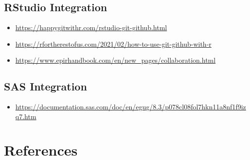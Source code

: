 \documentclass[
  letterpaper,
  DIV=11,
  numbers=noendperiod]{scrreprt}
\providecommand{\tightlist}{%
  \setlength{\itemsep}{0pt}\setlength{\parskip}{0pt}}\usepackage{longtable,booktabs,array}
\newlength{\cslhangindent}
\newlength{\cslentryspacingunit} %
\newenvironment{CSLReferences}[2] %
 {%
  \setlength{\parindent}{0pt}
  \ifodd #1
  \let\oldpar\par
  \def\par{\hangindent=\cslhangindent\oldpar}
  \fi
  \setlength{\parskip}{#2\cslentryspacingunit}
 }%
 {}
\begin{document}
\hypertarget{rstudio-integration}{%
\section{RStudio Integration}\label{rstudio-integration}}

\begin{itemize}
\item
  \url{https://happygitwithr.com/rstudio-git-github.html}
\item
  \url{https://rfortherestofus.com/2021/02/how-to-use-git-github-with-r}
\item
  \url{https://www.epirhandbook.com/en/new_pages/collaboration.html}
\end{itemize}

\hypertarget{sas-integration}{%
\section{SAS Integration}\label{sas-integration}}

\begin{itemize}
\tightlist
\item
  \url{https://documentation.sas.com/doc/en/egug/8.3/p078cl08fol7hkn11a8nf1f9izq7.htm}
\end{itemize}


\hypertarget{references}{%
\chapter*{References}\label{references}}


\hypertarget{refs}{}
\begin{CSLReferences}{0}{0}
\end{CSLReferences}
\end{document}
